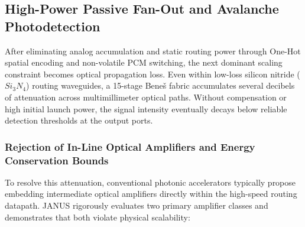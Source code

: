 \documentclass[journal]{IEEEtran}
\begin{document}
\subsection{\textbf{High-Power Passive Fan-Out and Avalanche Photodetection}}
\label{sec:passive_fanout_apd}

After eliminating analog accumulation and static routing power through One-Hot spatial encoding and non-volatile PCM switching, the next dominant scaling constraint becomes optical propagation loss. Even within low-loss silicon nitride ($Si_3N_4$) routing waveguides, a 15-stage Beneš fabric accumulates several decibels of attenuation across multimillimeter optical paths. Without compensation or high initial launch power, the signal intensity eventually decays below reliable detection thresholds at the output ports.

\subsubsection{\textbf{Rejection of In-Line Optical Amplifiers and Energy Conservation Bounds}}
To resolve this attenuation, conventional photonic accelerators typically propose embedding intermediate optical amplifiers directly within the high-speed routing datapath. JANUS rigorously evaluates two primary amplifier classes and demonstrates that both violate physical scalability:
\end{document}
